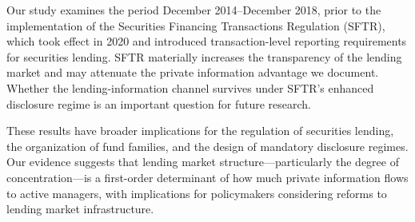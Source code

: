 Our study examines the period December 2014--December 2018, prior to the implementation of the Securities Financing Transactions Regulation (SFTR), which took effect in 2020 and introduced transaction-level reporting requirements for securities lending. SFTR materially increases the transparency of the lending market and may attenuate the private information advantage we document. Whether the lending-information channel survives under SFTR's enhanced disclosure regime is an important question for future research.

These results have broader implications for the regulation of securities lending, the organization of fund families, and the design of mandatory disclosure regimes. Our evidence suggests that lending market structure---particularly the degree of concentration---is a first-order determinant of how much private information flows to active managers, with implications for policymakers considering reforms to lending market infrastructure.
